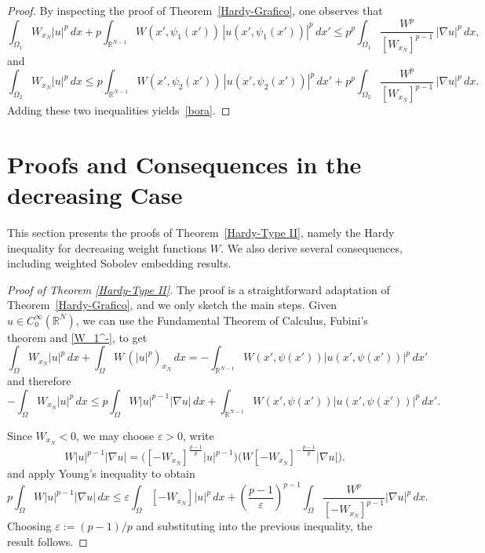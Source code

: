\documentclass[12pt]{amsart}
\theoremstyle{definition}
\theoremstyle{plain}
\begin{document}
\begin{proof} 
By inspecting the proof of Theorem~\ref{Hardy-Grafico}, one observes that
\[
    \int_{\Omega_1} W_{x_N} |u|^p \, dx 
    + p \int_{\mathbb{R}^{N-1}} W(x',\psi_1(x'))\, |u(x',\psi_1(x'))|^p \, dx' 
    \leq p^p \int_{\Omega_1} \frac{W^p}{[W_{x_N}]^{p-1}}\, |\nabla u|^p \, dx,
\]
and
\[
    \int_{\Omega_2} W_{x_N} |u|^p \, dx 
    \leq p \int_{\mathbb{R}^{N-1}} W(x',\psi_2(x'))\, |u(x',\psi_2(x'))|^p \, dx' 
    + p^p \int_{\Omega_2} \frac{W^p}{[W_{x_N}]^{p-1}}\, |\nabla u|^p \, dx.
\]
Adding these two inequalities yields~\eqref{bora}.
\end{proof}

\section{Proofs and Consequences in the decreasing Case} \label{sec:decreasing-case}
This section presents the proofs of Theorem~\ref{Hardy-Type II}, namely the Hardy inequality for decreasing weight functions $W$. We also derive several consequences, including weighted Sobolev embedding results.

\begin{proof}[Proof of Theorem \ref{Hardy-Type II}]
The proof is a straightforward adaptation of Theorem~\ref{Hardy-Grafico}, and we only sketch 
the main steps.   Given  \(u \in C_0^\infty(\mathbb{R}^N)\), we can use the Fundamental 
Theorem of Calculus, Fubini's theorem and \eqref{W_1^-}, to get
\[
\int_\Omega W_{x_N} |u|^p \, dx + \int_\Omega W \, (|u|^p)_{x_N} \, dx
= - \int_{\mathbb{R}^{N-1}} W(x',\psi(x')) |u(x',\psi(x'))|^p \, dx'
\]
and therefore
\[
-\int_\Omega W_{x_N} |u|^p \, dx 
\le p \int_\Omega W |u|^{p-1} |\nabla u| \, dx 
+ \int_{\mathbb{R}^{N-1}} W(x',\psi(x')) |u(x',\psi(x'))|^p \, dx'.
\]

Since \(W_{x_N} < 0\), we may choose $\varepsilon>0$, write
\[
W |u|^{p-1} |\nabla u| 
= \big( [-W_{x_N}]^{\frac{p-1}{p}} |u|^{p-1}\big) 
\big( W [-W_{x_N}]^{-\frac{p-1}{p}} |\nabla u| \big).
\]
and apply Young's inequality to obtain
\[
p \int_\Omega W |u|^{p-1} |\nabla u| \, dx
\le \varepsilon \int_\Omega [-W_{x_N}] |u|^p \, dx
+ \left(\frac{p-1}{\varepsilon}\right)^{p-1} \int_\Omega \frac{W^p}{[-W_{x_N}]^{p-1}} |\nabla u|^p \, dx.
\]
Choosing \(\varepsilon := (p-1)/p\) and substituting into the previous inequality, the result follows.
\end{proof}
\end{document}
